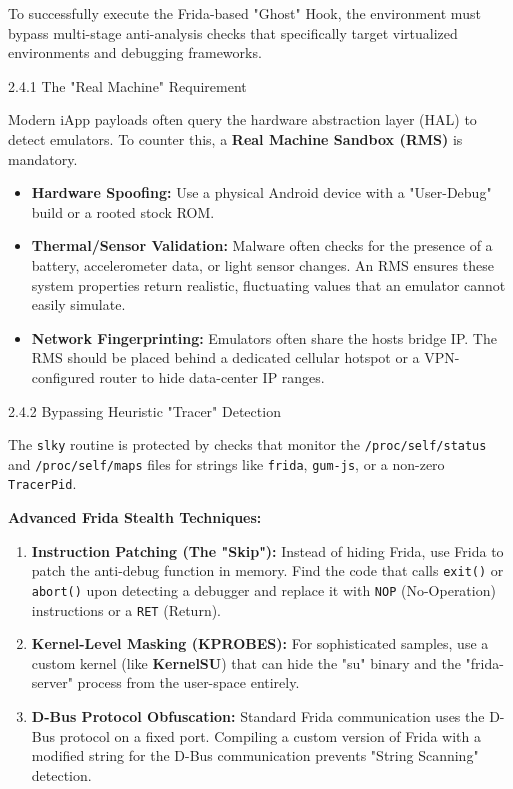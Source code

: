 \documentclass[
]{article}
\begin{document}
To successfully execute the Frida-based "Ghost" Hook, the environment
must bypass multi-stage anti-analysis checks that specifically target
virtualized environments and debugging frameworks.

2.4.1 The "Real Machine" Requirement

Modern iApp payloads often query the hardware abstraction layer (HAL) to
detect emulators. To counter this, a \textbf{Real Machine Sandbox (RMS)}
is mandatory.

\begin{itemize}
\item
  \textbf{Hardware Spoofing:} Use a physical Android device with a
  "User-Debug" build or a rooted stock ROM.
\item
  \textbf{Thermal/Sensor Validation:} Malware often checks for the
  presence of a battery, accelerometer data, or light sensor changes. An
  RMS ensures these system properties return realistic, fluctuating
  values that an emulator cannot easily simulate.
\item
  \textbf{Network Fingerprinting:} Emulators often share the
  host\textquotesingle s bridge IP. The RMS should be placed behind a
  dedicated cellular hotspot or a VPN-configured router to hide
  data-center IP ranges.
\end{itemize}

2.4.2 Bypassing Heuristic "Tracer" Detection

The \texttt{slky} routine is protected by checks that monitor the
\texttt{/proc/self/status} and \texttt{/proc/self/maps} files for
strings like \texttt{frida}, \texttt{gum-js}, or a non-zero
\texttt{TracerPid}.

\textbf{Advanced Frida Stealth Techniques:}

\begin{enumerate}
\def\labelenumi{\arabic{enumi}.}
\item
  \textbf{Instruction Patching (The "Skip"):} Instead of hiding Frida,
  use Frida to patch the anti-debug function in memory. Find the code
  that calls \texttt{exit()} or \texttt{abort()} upon detecting a
  debugger and replace it with \texttt{NOP} (No-Operation) instructions
  or a \texttt{RET} (Return).
\item
  \textbf{Kernel-Level Masking (KPROBES):} For sophisticated samples,
  use a custom kernel (like \textbf{KernelSU}) that can hide the "su"
  binary and the "frida-server" process from the user-space entirely.
\item
  \textbf{D-Bus Protocol Obfuscation:} Standard Frida communication uses
  the D-Bus protocol on a fixed port. Compiling a custom version of
  Frida with a modified string for the D-Bus communication prevents
  "String Scanning" detection.
\end{enumerate}
\end{document}
